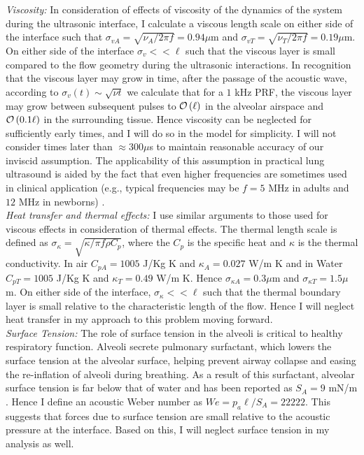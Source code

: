 \noindent\textit{Viscosity:} In consideration of effects of viscosity of the
dynamics of the system during the ultrasonic interface, I calculate a
viscous length scale on either side of the interface such that
$\sigma_{vA}=\sqrt{\nu_A/2\pi f}=0.94 \mu$m and
$\sigma_{vT}=\sqrt{\nu_T/2\pi f}=0.19 \mu$m. On either side of the
interface $\sigma_v << \ell$ such that the viscous layer is small
compared to the flow geometry during the ultrasonic interactions. In
recognition that the viscous layer may grow in time, after the passage
of the acoustic wave, according to $\sigma_{v}(t)\sim\sqrt{\nu t}$ we
calculate that for a $1$ kHz \ac{PRF}, the viscous layer may grow
between subsequent pulses to $\mathcal{O}\left(\ell\right)$ in the alveolar airspace
and $\mathcal{O}\left(0.1\ell\right)$ in the surrounding tissue. Hence viscosity can
be neglected for sufficiently early times, and I will do so in the
model for simplicity. I will not consider times later than
$\approx300 \mu$s to maintain reasonable accuracy of our inviscid
assumption. The applicability of this assumption in practical lung
ultrasound is aided by the fact that even higher frequencies are
sometimes used in clinical application (e.g., typical frequencies may be $f = 5$ MHz in adults and $12$ MHz in newborns) \cite{Lichtenstein2009}.\\

\noindent\textit{Heat transfer and thermal effects:} I use similar arguments to
those used for viscous effects in consideration of thermal
effects. The thermal length scale is defined as
$\sigma_\kappa=\sqrt{\kappa/\pi f \rho C_p}$, where the $C_p$ is the
specific heat and $\kappa$ is the thermal conductivity. In air
$C_{pA}=1005$ J/Kg K and $\kappa_A=0.027$ W/m K and in Water
$C_{pT}=1005$ J/Kg K and $\kappa_T=0.49$ W/m K. Hence
$\sigma_{\kappa A} = 0.3 \mu$m and $\sigma_{\kappa T} = 1.5 \mu$m. On
either side of the interface, $\sigma_\kappa << \ell$ such that the
thermal boundary layer is small relative to the characteristic length
of the flow. Hence I will neglect heat transfer in my approach to this
problem moving forward.\\

\noindent\textit{Surface Tension:} The role of surface tension in the alveoli
is critical to healthy respiratory function. Alveoli secrete pulmonary
surfactant, which lowers the surface tension at the alveolar surface,
helping prevent airway collapse and easing the re-inflation of alveoli
during breathing. As a result of this surfactant, alveolar surface
tension is far below that of water and has been reported as $S_A = 9$
mN/m \citep{Schurch1976}. Hence I define an acoustic Weber number as
$We = p_a\ell/S_A = 22222$. This suggests that forces due to surface
tension are small relative to the acoustic pressure at the
interface. Based on this, I will neglect surface tension in my
analysis as well.\\

